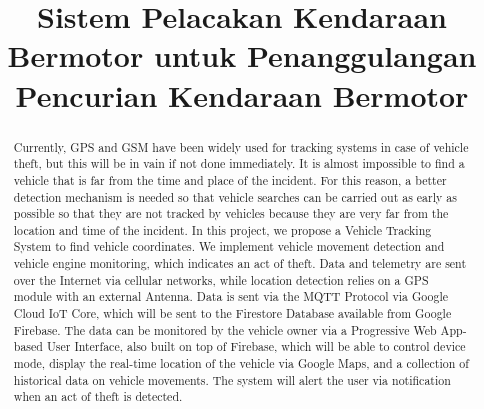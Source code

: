 \documentclass[conference]{IEEEtran}
\begin{document}
\title{Sistem Pelacakan Kendaraan Bermotor untuk Penanggulangan Pencurian Kendaraan Bermotor}

\author{
}


\maketitle

\renewcommand{\abstractname}{Abstrak}
\renewcommand{\refname}{Referensi}

\begin{abstract}
Currently, GPS and GSM have been widely used for tracking systems in case of vehicle theft, but this will be in vain if not done immediately. It is almost impossible to find a vehicle that is far from the time and place of the incident. For this reason, a better detection mechanism is needed so that vehicle searches can be carried out as early as possible so that they are not tracked by vehicles because they are very far from the location and time of the incident. In this project, we propose a Vehicle Tracking System to find vehicle coordinates. We implement vehicle movement detection and vehicle engine monitoring, which indicates an act of theft. Data and telemetry are sent over the Internet via cellular networks, while location detection relies on a GPS module with an external Antenna. Data is sent via the MQTT Protocol via Google Cloud IoT Core, which will be sent to the Firestore Database available from Google Firebase. The data can be monitored by the vehicle owner via a Progressive Web App-based User Interface, also built on top of Firebase, which will be able to control device mode, display the real-time location of the vehicle via Google Maps, and a collection of historical data on vehicle movements. The system will alert the user via notification when an act of theft is detected.
\end{abstract}
\end{document}
